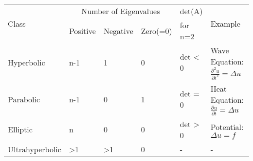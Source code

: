 \begin{center}
\begin{tabular}{|l||l|l|l|l|l|}
\hline
\multirow{2}{*}{Class}&\multicolumn{3}{|c|}{Number of Eigenvalues} & det(A)&\multirow{2}{*}{Example}\\
& Positive & Negative & Zero(=0) & for n=2 &\\
\hline
Hyperbolic& n-1 & 1 & 0 & det < 0 & Wave Equation: $\frac{\partial^2 u}{\partial t^2} = \Delta u$ \\
\hline
Parabolic& n-1 & 0 & 1 & det = 0 & Heat Equation: $\frac{\partial u}{\partial t} = \Delta u$  \\
\hline
Elliptic&	n & 0 & 0 & det > 0 & Potential: $\Delta u = f$ \\
\hline
Ultrahyperbolic & >1 & >1 & 0 & - & -\\
\hline
\end{tabular}
\end{center}
